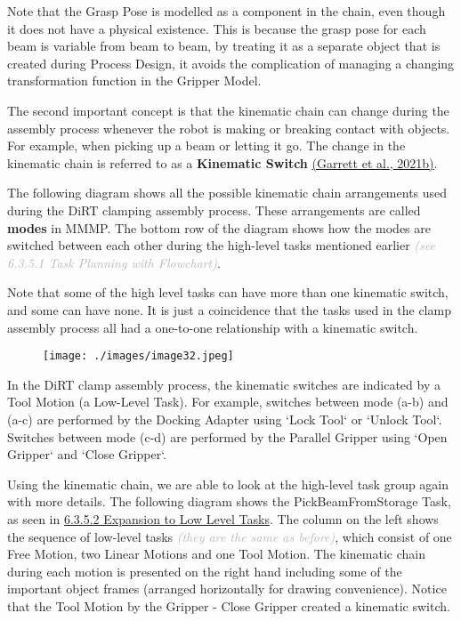 Note that the Grasp Pose is modelled as a component in the chain, even though it does not have a physical existence. This is because the grasp pose for each beam is variable from beam to beam, by treating it as a separate object that is created during Process Design, it avoids the complication of managing a changing transformation function in the Gripper Model.


The second important concept is that the kinematic chain can change during the assembly process whenever the robot is making or breaking contact with objects. For example, when picking up a beam or letting it go. The change in the kinematic chain is referred to as a \textbf{Kinematic Switch} \href{https://www.zotero.org/google-docs/?QSVbB7}{(Garrett et al., 2021b)}. 

The following diagram shows all the possible kinematic chain arrangements used during the DiRT clamping assembly process. These arrangements are called \textbf{modes }in MMMP. The bottom row of the diagram shows how the modes are switched between each other during the high-level tasks mentioned earlier \textit{\textcolor[HTML]{B7B7B7}{(see 6.3.5.1 Task Planning with Flowchart)}}. 

Note that some of the high level tasks can have more than one kinematic switch, and some can have none. It is just a coincidence that the tasks used in the clamp assembly process all had a one-to-one relationship with a kinematic switch. 

\begin{figure}[H]
\texttt{[image: ./images/image32.jpeg]}
\end{figure}


In the DiRT clamp assembly process, the kinematic switches are indicated by a Tool Motion (a Low-Level Task). For example, switches between mode (a-b) and (a-c) are performed by the Docking Adapter using `Lock Tool` or `Unlock Tool`. Switches between mode (c-d) are performed by the Parallel Gripper using `Open Gripper` and `Close Gripper`.


Using the kinematic chain, we are able to look at the high-level task group again with more details. The following diagram shows the PickBeamFromStorage Task, as seen in \uline{6.3.5.2 Expansion to Low Level Tasks}. The column on the left shows the sequence of low-level tasks \textit{\textcolor[HTML]{B7B7B7}{(they are the same as before)}}, which consist of one Free Motion, two Linear Motions and one Tool Motion. The kinematic chain during each motion is presented on the right hand including some of the important object frames (arranged horizontally for drawing convenience). Notice that the Tool Motion by the Gripper - Close Gripper created a kinematic switch. 

